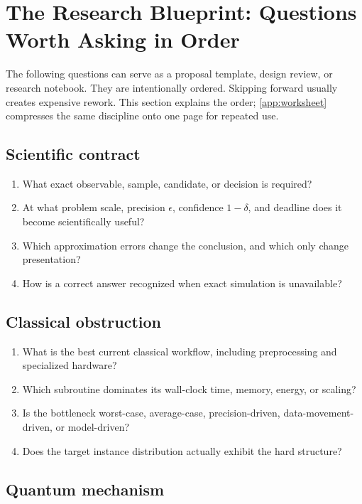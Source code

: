 \section{The Research Blueprint: Questions Worth Asking in Order}

The following questions can serve as a proposal template, design review, or research notebook. They are intentionally ordered. Skipping forward usually creates expensive rework. This section explains the order; \cref{app:worksheet} compresses the same discipline onto one page for repeated use.

\subsection{Scientific contract}

\begin{enumerate}
  \item What exact observable, sample, candidate, or decision is required?
  \item At what problem scale, precision $\epsilon$, confidence $1-\delta$, and deadline does it become scientifically useful?
  \item Which approximation errors change the conclusion, and which only change presentation?
  \item How is a correct answer recognized when exact simulation is unavailable?
\end{enumerate}

\subsection{Classical obstruction}

\begin{enumerate}[resume]
  \item What is the best current classical workflow, including preprocessing and specialized hardware?
  \item Which subroutine dominates its wall-clock time, memory, energy, or scaling?
  \item Is the bottleneck worst-case, average-case, precision-driven, data-movement-driven, or model-driven?
  \item Does the target instance distribution actually exhibit the hard structure?
\end{enumerate}

\subsection{Quantum mechanism}

